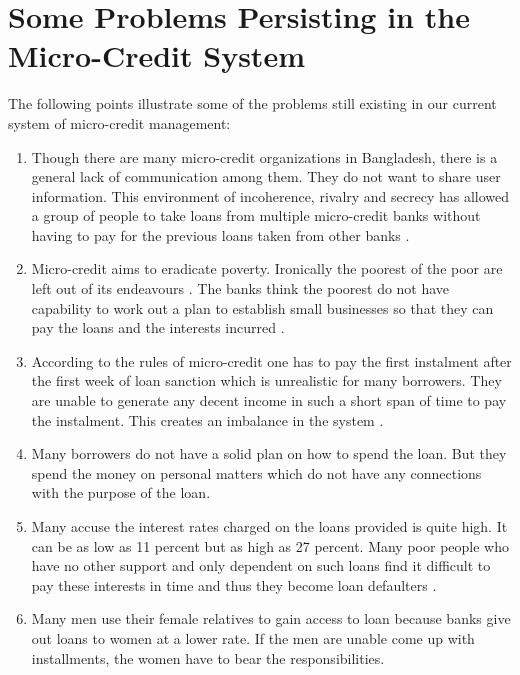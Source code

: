 \documentclass{report}
\begin{document}
\chapter{Some Problems Persisting in the Micro-Credit System}
The following points illustrate some of the problems still existing in our current system of micro-credit management:
\begin{enumerate}
\item Though there are many micro-credit organizations in   Bangladesh, there is  a general   lack of communication among them. They do not want to share user information. This environment of incoherence, rivalry and secrecy has allowed a group of people to take loans from multiple micro-credit banks without having to pay for the previous loans taken from other banks \cite{13}.
\item Micro-credit aims to eradicate poverty. Ironically the poorest of the poor are left out of its endeavours \cite{14}. The banks think  the poorest do not have capability to work out a plan to establish small businesses so  that they can pay the loans and the interests incurred \cite{15}.
\item According to the rules of micro-credit one has to pay the first instalment after the first week of loan sanction which is unrealistic for many borrowers. They are unable to generate any decent income in such a short span of time to pay the instalment. This creates an imbalance in the system \cite{16}.
\item Many borrowers do not have a solid plan on how to spend the loan. But they spend the money on personal matters which do not have any connections with the purpose of the loan.
\item Many accuse the interest rates charged on the loans provided is quite high. It can be as low as 11 percent but as high as 27 percent. Many poor people who have no other support and only dependent on such loans find it difficult to pay these interests in time and thus they become loan defaulters \cite{17}. 
\item Many men use their female relatives to gain access to loan because banks give out loans to women at a lower rate. If the men are unable come up with installments, the women have to bear the responsibilities.
\end{enumerate}
\newpage
\end{document}
